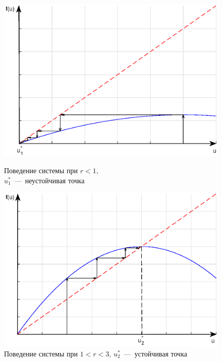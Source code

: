 \begin{figure}[h]
\begin{center}
\begin{minipage}[h]{0.49\linewidth}
\includegraphics[width=1\linewidth]{ch1/ch1_fig5.eps}
\caption{Поведение системы при $r < 1$,\\ $u_1^*$~---~неустойчивая точка}
\label{ch1.fig5}
\end{minipage}
\hfill
\begin{minipage}[h]{0.49\linewidth}
\includegraphics[width=1\linewidth]{ch1/ch1_fig6.eps}
\caption{Поведение системы при $1 < r < 3$, $u_2^*$~---~устойчивая точка}
\label{ch1.fig6}
\end{minipage}
\end{center}
\end{figure}


